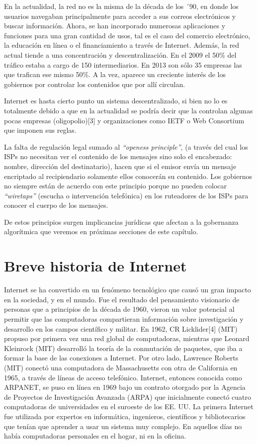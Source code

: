 \documentclass[12pt]{report} %
\begin{document}
En la actualidad, la red no es la misma de la década de los ´90, en donde los usuarios navegaban principalmente para acceder a sus correos electrónicos y buscar información. Ahora, se han incorporado numerosas aplicaciones y funciones para una gran cantidad de usos, tal es el caso del comercio electrónico, la educación en línea o el financiamiento a través de Internet. Además, la red actual tiende a una concentración y descentralización. En el 2009 el 50\% del tráfico estaba a cargo de 150 intermediarios. En 2013 son sólo 35 empresas las que trafican ese mismo 50\%. A la vez, aparece un creciente interés de los gobiernos por controlar los contenidos que por allí circulan.

Internet es hasta cierto punto un sistema descentralizado, si bien no lo es totalmente debido a que en la actualidad se podría decir que la controlan algunas pocas empresas (oligopolio)[3] y organizaciones como IETF o Web Consortium que imponen sus reglas. 

La falta de regulación legal sumado al \textit{“openess principle”}, (a través del cual los ISPs no necesitan ver el contenido de los mensajes sino solo el encabezado: nombre, dirección del destinatario), hacen que si el emisor envía un mensaje encriptado al recipiendario solamente ellos conocerán su contenido. Los gobiernos no siempre están de acuerdo con este principio porque no pueden colocar \textit{“wire\-taps”} (escucha o intervención telefónica) en los ruteadores de los ISPs para conocer el cuerpo de los mensajes.

De estos principios surgen implicancias jurídicas que afectan a la gobernanza algorítmica que veremos en próximas secciones de este capítulo. 

\section{Breve historia de Internet}

Internet se ha convertido en un fenómeno tecnológico que causó un gran impacto en la sociedad, y en el mundo. Fue el resultado del pensamiento visionario de personas que a principios de la década de 1960, vieron un valor potencial al permitir que las computadoras compartieran información sobre investigación y desarrollo en los campos científico y militar. En 1962, CR Licklider[4] (MIT) propuso por primera vez una red global de computadoras, mientras que Leonard Kleinrock (MIT) desarrolló la teoría de la conmutación de paquetes, que iba a formar la base de las conexiones a Internet. Por otro lado, Lawrence Roberts (MIT) conectó una computadora de Massachusetts con otra de California en 1965, a través de líneas de acceso telefónico. Internet, entonces conocida como ARPANET, se puso en línea en 1969 bajo un contrato otorgado por la Agencia de Proyectos de Investigación Avanzada (ARPA) que inicialmente conectó cuatro computadoras de universidades en el suroeste de los EE. UU. La primera Internet fue utilizada por expertos en informática, ingenieros, científicos y bibliotecarios que tenían que aprender a usar un sistema muy complejo. En aquellos días no había computadoras personales en el hogar, ni en la oficina.
\end{document}
